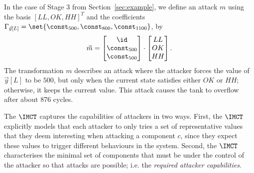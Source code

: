 {\begin{example}
  \label{ex:attack}
  In the case of Stage 3 from Section~\ref{sec:example}, we define an attack $m$ using the basis $[LL, OK, HH]^T$ and the coefficients $\Gamma_{\vec{y}[L]}=\set{\const_{500}, \const_{800},  \const_{1100}}$, by
\begin{align}
  \vec{m}=
  \begin{bmatrix}
    \id \\
    \const_{500} \\
    \const_{500}
  \end{bmatrix}
  \cdot
  \begin{bmatrix}
    LL \\
    OK\\
    HH
  \end{bmatrix}.
\end{align}
The transformation $m$ describes an attack where the attacker forces the value of $\vec{y}[L]$ to be $500$, but only when the current state satisfies either $OK$ or $HH$; otherwise, it keeps the current value. This attack causes the tank to overflow after about 876 cycles.
\end{example}
The $\IMCT$ captures the capabilities of attackers in two ways. First, the $\IMCT$ explicitly models that each attacker to only tries a set of representative values that they deem interesting when attacking a component $c$, since they expect these values to trigger different behaviours in the system. Second, the $\IMCT$ characterises the minimal set of components that must be under the control of the attacker so that attacks are possible; i.e. the \emph{required attacker capabilities}.

}
